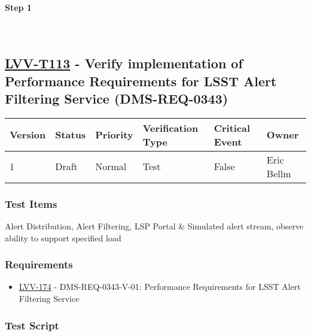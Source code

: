 \textbf{Step 1}\\
~\\
~\\

\hypertarget{lvv-t113---verify-implementation-of-performance-requirements-for-lsst-alert-filtering-service-dms-req-0343}{%
\subsection{\texorpdfstring{\href{https://jira.lsstcorp.org/secure/Tests.jspa\#/testCase/LVV-T113}{LVV-T113}
- Verify implementation of Performance Requirements for LSST Alert
Filtering Service
(DMS-REQ-0343)}{LVV-T113 - Verify implementation of Performance Requirements for LSST Alert Filtering Service (DMS-REQ-0343)}}\label{lvv-t113---verify-implementation-of-performance-requirements-for-lsst-alert-filtering-service-dms-req-0343}}

\begin{longtable}[]{@{}llllll@{}}
\toprule
Version & Status & Priority & Verification Type & Critical Event &
Owner\tabularnewline
\midrule
\endhead
1 & Draft & Normal & Test & False & Eric Bellm\tabularnewline
\bottomrule
\end{longtable}

\hypertarget{test-items-89}{%
\subsubsection{Test Items}\label{test-items-89}}

Alert Distribution, Alert Filtering, LSP Portal \& Simulated alert
stream, observe ability to support specified load

\hypertarget{requirements-90}{%
\subsubsection{Requirements}\label{requirements-90}}

\begin{itemize}
\tightlist
\item
  \href{https://jira.lsstcorp.org/browse/LVV-174}{LVV-174} -
  DMS-REQ-0343-V-01: Performance Requirements for LSST Alert Filtering
  Service
\end{itemize}

\hypertarget{test-script-90}{%
\subsubsection{Test Script}\label{test-script-90}}

